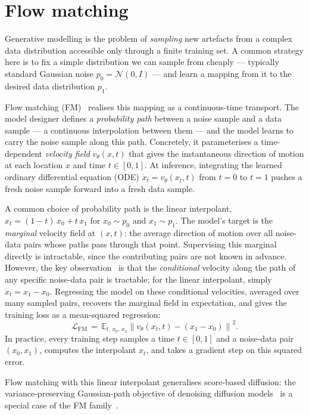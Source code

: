 \documentclass[12pt,a4paper,twoside]{report}
\begin{document}
\section{Flow matching}
\label{sec:flow-matching}

Generative modelling is the problem of \emph{sampling} new artefacts from a complex data distribution accessible only through a finite training set. A common strategy here is to fix a simple distribution we can sample from cheaply --- typically standard Gaussian noise $p_0 = \mathcal{N}(0, I)$ --- and learn a mapping from it to the desired data distribution $p_1$.

Flow matching (FM)~\cite{FlowMatching} realises this mapping as a continuous-time transport. The model designer defines a \emph{probability path} between a noise sample and a data sample --- a continuous interpolation between them --- and the model learns to carry the noise sample along this path. Concretely, it parameterises a time-dependent \emph{velocity field} $v_\theta(x, t)$ that gives the instantaneous direction of motion at each location $x$ and time $t \in [0, 1]$. At inference, integrating the learned ordinary differential equation (ODE) $\dot{x}_t = v_\theta(x_t, t)$ from $t = 0$ to $t = 1$ pushes a fresh noise sample forward into a fresh data sample.

A common choice of probability path is the linear interpolant, $x_t = (1-t)\, x_0 + t\, x_1$ for $x_0 \sim p_0$ and $x_1 \sim p_1$. The model's target is the \emph{marginal} velocity field at $(x, t)$: the average direction of motion over all noise-data pairs whose paths pass through that point. Supervising this marginal directly is intractable, since the contributing pairs are not known in advance. However, the key observation~\cite{FlowMatching} is that the \emph{conditional} velocity along the path of any specific noise-data pair is tractable: for the linear interpolant, simply $\dot{x}_t = x_1 - x_0$. Regressing the model on these conditional velocities, averaged over many sampled pairs, recovers the marginal field in expectation, and gives the training loss as a mean-squared regression:
\[
  \mathcal{L}_{\text{FM}} \,=\, \mathbb{E}_{t,\, x_0,\, x_1} \left\| v_\theta(x_t, t) - (x_1 - x_0) \right\|^2.
\]
In practice, every training step samples a time $t \in [0,1]$ and a noise-data pair $(x_0, x_1)$, computes the interpolant $x_t$, and takes a gradient step on this squared error.

Flow matching with this linear interpolant generalises score-based diffusion: the variance-preserving Gaussian-path objective of denoising diffusion models~\cite{DDPM} is a special case of the FM family~\cite{FlowMatching,FMGuide}.
\end{document}

